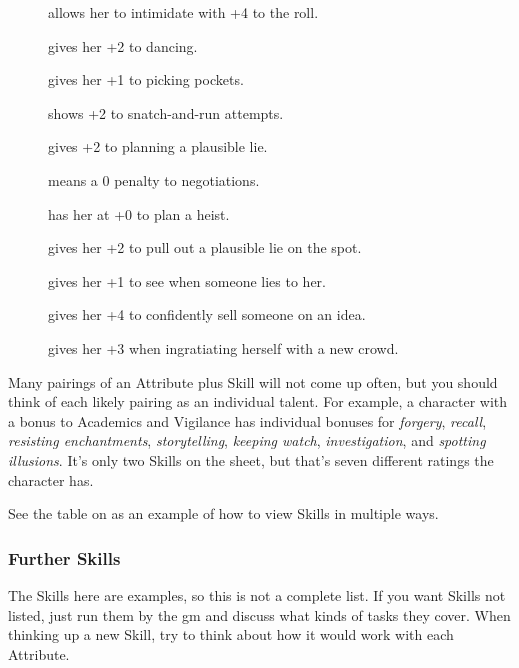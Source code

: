 \begin{multicols}{2}
\begin{description}
  \item[]
    allows her to intimidate with +4 to the roll.
  \item[]
    gives her +2 to dancing.
  \item[]
    gives her +1 to picking pockets.
  \item[]
    shows +2 to snatch-and-run attempts.
  \item[]
    gives +2 to planning a plausible lie.
  \item[]
    means a 0 penalty to negotiations.
  \item[]
    has her at +0 to plan a heist.
  \item[]
    gives her +2 to pull out a plausible lie on the spot.
  \item[]
    gives her +1 to see when someone lies to her.
  \item[]
    gives her +4 to confidently sell someone on an idea.
  \item[]
    gives her +3 when ingratiating herself with a new crowd.
\end{description}

Many pairings of an Attribute plus Skill will not come up often, but you should think of each likely pairing as an individual talent.
For example, a character with a bonus to Academics and Vigilance has individual bonuses for \textit{forgery}, \textit{recall}, \textit{resisting enchantments}, \textit{storytelling}, \textit{keeping watch}, \textit{investigation}, and \textit{spotting illusions}.
It's only two Skills on the sheet, but that's seven different ratings the character has.

See the table on  as an example of how to view Skills in multiple ways.

\bigSkillsTable

\subsubsection{Further Skills}

The Skills here are examples, so this is not a complete list.
If you want Skills not listed, just run them by the \gls{gm} and discuss what kinds of tasks they cover.
When thinking up a new Skill, try to think about how it would work with each Attribute.


\end{multicols}
